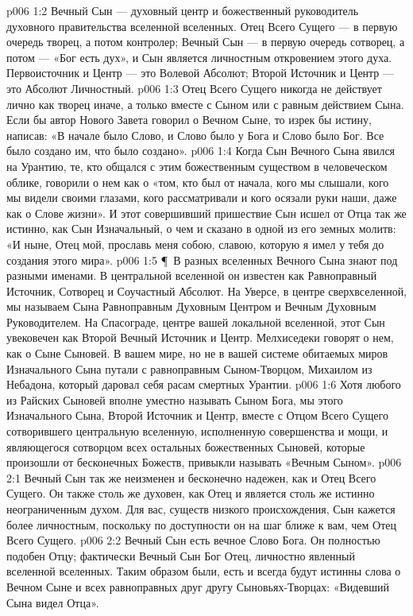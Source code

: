 \vs p006 1:2 Вечный Сын --- духовный центр и божественный руководитель духовного правительства вселенной вселенных. Отец Всего Сущего --- в первую очередь творец, а потом контролер; Вечный Сын --- в первую очередь сотворец, а потом ---  «Бог есть дух», и Сын является личностным откровением этого духа. Первоисточник и Центр --- это Волевой Абсолют; Второй Источник и Центр --- это Абсолют Личностный.
\vs p006 1:3 Отец Всего Сущего никогда не действует лично как творец иначе, а только вместе с Сыном или с равным действием Сына. Если бы автор Нового Завета говорил о Вечном Сыне, то изрек бы истину, написав: «В начале было Слово, и Слово было у Бога и Слово было Бог. Все было создано им, что было создано».
\vs p006 1:4 Когда Сын Вечного Сына явился на Урантию, те, кто общался с этим божественным существом в человеческом облике, говорили о нем как о «том, кто был от начала, кого мы слышали, кого мы видели своими глазами, кого рассматривали и кого осязали руки наши, даже как о Слове жизни». И этот совершивший пришествие Сын исшел от Отца так же истинно, как Сын Изначальный, о чем и сказано в одной из его земных молитв: «И ныне, Отец мой, прославь меня собою, славою, которую я имел у тебя до создания этого мира».
\vs p006 1:5 \P\ В разных вселенных Вечного Сына знают под разными именами. В центральной вселенной он известен как Равноправный Источник, Сотворец и Соучастный Абсолют. На Уверсе, в центре сверхвселенной, мы называем Сына Равноправным Духовным Центром и Вечным Духовным Руководителем. На Спасограде, центре вашей локальной вселенной, этот Сын увековечен как Второй Вечный Источник и Центр. Мелхиседеки говорят о нем, как о Сыне Сыновей. В вашем мире, но не в вашей системе обитаемых миров Изначального Сына путали с равноправным Сыном\hyp{}Творцом, Михаилом из Небадона, который даровал себя расам смертных Урантии.
\vs p006 1:6 Хотя любого из Райских Сыновей вполне уместно называть Сыном Бога, мы этого Изначального Сына, Второй Источник и Центр, вместе с Отцом Всего Сущего сотворившего центральную вселенную, исполненную совершенства и мощи, и являющегося сотворцом всех остальных божественных Сыновей, которые произошли от бесконечных Божеств, привыкли называть «Вечным Сыном».
\vs p006 2:1 Вечный Сын так же неизменен и бесконечно надежен, как и Отец Всего Сущего. Он также столь же духовен, как Отец и является столь же истинно неограниченным духом. Для вас, существ низкого происхождения, Сын кажется более личностным, поскольку по доступности он на шаг ближе к вам, чем Отец Всего Сущего.
\vs p006 2:2 Вечный Сын есть вечное Слово Бога. Он полностью подобен Отцу; фактически Вечный Сын  Бог Отец, личностно явленный вселенной вселенных. Таким образом были, есть и всегда будут истинны слова о Вечном Сыне и всех равноправных друг другу Сыновьях\hyp{}Творцах: «Видевший Сына видел Отца».
